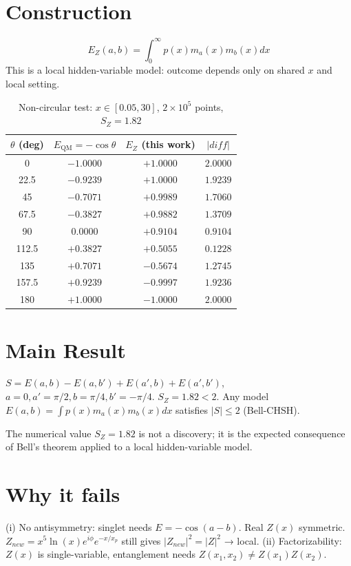 \documentclass[11pt,a4paper]{article}
\begin{document}
\section{Construction}
\begin{equation}
    E_Z(a,b)=\int_0^\infty p(x) m_a(x) m_b(x) dx
\end{equation}
This is a local hidden-variable model: outcome depends only on shared $x$ and local setting.

\begin{table}[h]
\centering
\begin{tabular}{cccc}
\toprule
$\theta$ (deg) & $E_{\mathrm{QM}}=-\cos\theta$ & $E_Z$ (this work) & $|diff|$ \\
\midrule
0 & $-1.0000$ & $+1.0000$ & $2.0000$ \\
22.5 & $-0.9239$ & $+1.0000$ & $1.9239$ \\
45 & $-0.7071$ & $+0.9989$ & $1.7060$ \\
67.5 & $-0.3827$ & $+0.9882$ & $1.3709$ \\
90 & $0.0000$ & $+0.9104$ & $0.9104$ \\
112.5 & $+0.3827$ & $+0.5055$ & $0.1228$ \\
135 & $+0.7071$ & $-0.5674$ & $1.2745$ \\
157.5 & $+0.9239$ & $-0.9997$ & $1.9236$ \\
180 & $+1.0000$ & $-1.0000$ & $2.0000$ \\
\bottomrule
\end{tabular}
\caption{Non-circular test: $x\in[0.05,30]$, $2\times10^5$ points, $S_Z=1.82$}
\end{table}

\section{Main Result}
$S=E(a,b)-E(a,b')+E(a',b)+E(a',b')$, $a=0,a'=\pi/2,b=\pi/4,b'=-\pi/4$.
$S_Z=1.82<2$. Any model $E(a,b)=\int p(x)m_a(x)m_b(x)dx$ satisfies $|S|\le2$ (Bell-CHSH).

The numerical value $S_Z = 1.82$ is not a discovery; it is the expected
consequence of Bell's theorem applied to a local hidden-variable model.

\section{Why it fails}
(i) No antisymmetry: singlet needs $E=-\cos(a-b)$. Real $Z(x)$ symmetric.
$Z_{new}=x^5\ln(x)e^{i\phi}e^{-x/x_p}$ still gives $|Z_{new}|^2=|Z|^2$ → local.
(ii) Factorizability: $Z(x)$ is single-variable, entanglement needs $Z(x_1,x_2)\neq Z(x_1)Z(x_2)$.
\end{document}
